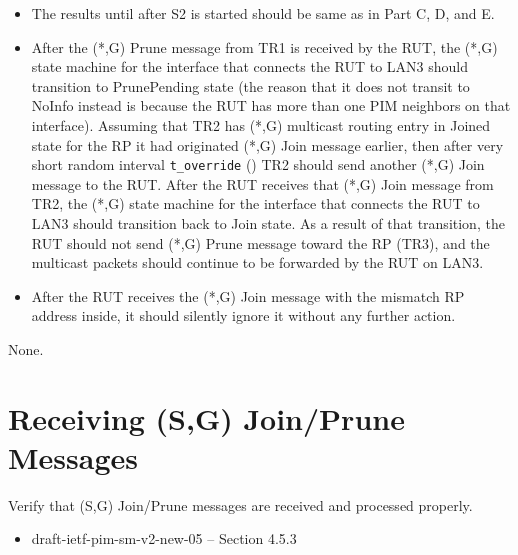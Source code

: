 \documentclass[11pt]{report}
\begin{document}

\begin{itemize}

  \item The results until after S2 is started should be same as in
  Part C, D, and E.

  \item After the (*,G) Prune message from TR1 is received by the RUT,
  the (*,G) state machine for the interface that connects the RUT to
  LAN3 should transition to PrunePending state (the reason that it does
  not transit to NoInfo instead is because the RUT has more than one PIM
  neighbors on that interface).
  Assuming that TR2 has (*,G) multicast routing entry in Joined state
  for the RP it had originated (*,G) Join message earlier, then after
  very short random interval \verb=t_override= ({\PimsmTOverride}) TR2
  should send another (*,G) Join message to the RUT.
  After the RUT receives that (*,G) Join message from TR2,
  the (*,G) state machine for the interface that connects the RUT to
  LAN3 should transition back to Join state.
  As a result of that transition, the RUT should not send (*,G) Prune
  message toward the RP (TR3), and the multicast packets should continue
  to be forwarded by the RUT on LAN3.

\end{itemize}


\begin{itemize}
  \item After the RUT receives the (*,G) Join message with the mismatch RP
  address inside, it should silently ignore it without any further action.
\end{itemize}

None.


\newpage
\section{Receiving (S,G) Join/Prune Messages}

Verify that (S,G) Join/Prune messages are received and processed
properly.

\begin{itemize}
  \item draft-ietf-pim-sm-v2-new-05 -- Section 4.5.3
\end{itemize}
\end{document}
